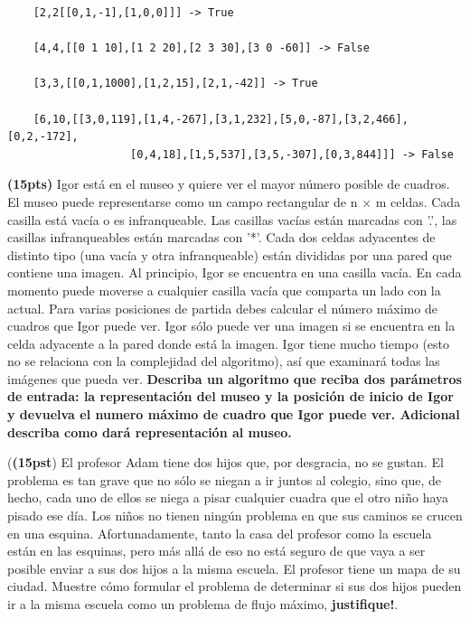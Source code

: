 \documentclass[12pt, a4paper]{exam}
\begin{document}
\begin{questions}
    \begin{verbatim}
    [2,2[[0,1,-1],[1,0,0]]] -> True
    
    [4,4,[[0 1 10],[1 2 20],[2 3 30],[3 0 -60]] -> False

    [3,3,[[0,1,1000],[1,2,15],[2,1,-42]] -> True
    
    [6,10,[[3,0,119],[1,4,-267],[3,1,232],[5,0,-87],[3,2,466],[0,2,-172],
                   [0,4,18],[1,5,537],[3,5,-307],[0,3,844]]] -> False
    \end{verbatim}
    
	\question  \textbf{(15pts)} Igor está en el museo y quiere ver el mayor número posible de cuadros. El museo puede representarse como un campo rectangular de n × m celdas. Cada casilla está vacía o es infranqueable. Las casillas vacías están marcadas con '.', las casillas infranqueables están marcadas con '*'. Cada dos celdas adyacentes de distinto tipo (una vacía y otra infranqueable) están divididas por una pared que contiene una imagen. Al principio, Igor se encuentra en una casilla vacía. En cada momento puede moverse a cualquier casilla vacía que comparta un lado con la actual. Para varias posiciones de partida debes calcular el número máximo de cuadros que Igor puede ver. Igor sólo puede ver una imagen si se encuentra en la celda adyacente a la pared donde está la imagen. Igor tiene mucho tiempo (esto no se relaciona con la complejidad del algoritmo), así que examinará todas las imágenes que pueda ver.
    \textbf{Describa un algoritmo que reciba dos parámetros de entrada: la representación del museo y la posición de inicio de Igor y devuelva el numero máximo de cuadro que Igor puede ver. Adicional describa como dará representación al museo. }

 
	\question (\textbf{(15pst}) El profesor Adam tiene dos hijos que, por desgracia, no se gustan. El problema es tan grave que no sólo se niegan a ir juntos al colegio, sino que, de hecho, cada uno de ellos se niega a pisar cualquier cuadra que el otro niño haya pisado ese día. 
Los niños no tienen ningún problema en que sus caminos se crucen en una esquina. Afortunadamente, tanto la casa del profesor como la escuela están en las esquinas, pero más allá de eso no está seguro de que vaya a ser posible enviar a sus dos hijos a la misma escuela. El profesor tiene un mapa de su ciudad. Muestre cómo formular el problema de determinar si sus dos hijos pueden ir a la misma escuela como un problema de flujo máximo, \textbf{justifique!}.
	

\end{questions}
\end{document}
